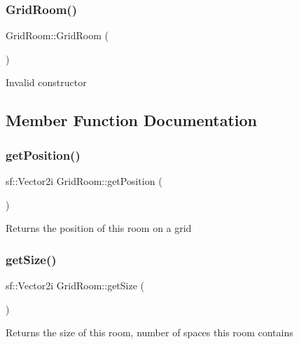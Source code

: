 \subsubsection{\texorpdfstring{Grid\+Room()}{GridRoom()}}
{\footnotesize\ttfamily Grid\+Room\+::\+Grid\+Room (\begin{DoxyParamCaption}{ }\end{DoxyParamCaption})}

Invalid constructor 

\subsection{Member Function Documentation}
\mbox{\label{classGridRoom_a9bbbc4f711ae7c40633d54eafe1cb792}} 
\subsubsection{\texorpdfstring{get\+Position()}{getPosition()}}
{\footnotesize\ttfamily sf\+::\+Vector2i Grid\+Room\+::get\+Position (\begin{DoxyParamCaption}{ }\end{DoxyParamCaption})}

\begin{DoxyReturn}{Returns}
the position of this room on a grid 
\end{DoxyReturn}
\mbox{\label{classGridRoom_a5c5dc96b8f2a29220ffa654f1aa30bac}} 
\subsubsection{\texorpdfstring{get\+Size()}{getSize()}}
{\footnotesize\ttfamily sf\+::\+Vector2i Grid\+Room\+::get\+Size (\begin{DoxyParamCaption}{ }\end{DoxyParamCaption})}

\begin{DoxyReturn}{Returns}
the size of this room, number of spaces this room contains 
\end{DoxyReturn}
\mbox{\label{classGridRoom_a5d0d7081a46dae2c15dd3f2935387450}} 

